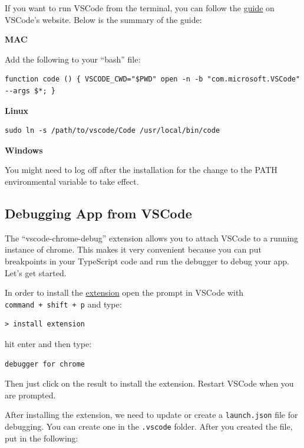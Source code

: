 \documentclass[12pt,]{article}
\begin{document}
If you want to run VSCode from the terminal, you can follow the
\href{https://code.visualstudio.com/Docs/editor/setup}{guide} on
VSCode's website. Below is the summary of the guide:

\textbf{MAC}

Add the following to your ``bash'' file:

\begin{verbatim}
function code () { VSCODE_CWD="$PWD" open -n -b "com.microsoft.VSCode" --args $*; }
\end{verbatim}

\textbf{Linux}

\begin{verbatim}
sudo ln -s /path/to/vscode/Code /usr/local/bin/code
\end{verbatim}

\textbf{Windows}

You might need to log off after the installation for the change to the
PATH environmental variable to take effect.

\hypertarget{debugging-app-from-vscode}{\subsection{Debugging App from
VSCode}\label{debugging-app-from-vscode}}

The ``vscode-chrome-debug'' extension allows you to attach VSCode to a
running instance of chrome. This makes it very convenient because you
can put breakpoints in your TypeScript code and run the debugger to
debug your app. Let's get started.

In order to install the
\href{https://github.com/Microsoft/vscode-chrome-debug}{extension} open
the prompt in VSCode with \texttt{command\ +\ shift\ +\ p} and type:

\begin{verbatim}
> install extension
\end{verbatim}

hit enter and then type:

\begin{verbatim}
debugger for chrome
\end{verbatim}

Then just click on the result to install the extension. Restart VSCode
when you are prompted.

After installing the extension, we need to update or create a
\texttt{launch.json} file for debugging. You can create one in the
\texttt{.vscode} folder. After you created the file, put in the
following:
\end{document}
